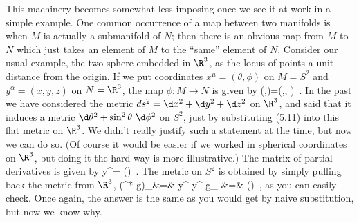 \documentclass[12pt]{article}
\begin{document}
This machinery becomes somewhat less imposing once we see it at work
in a simple example.  One common occurrence of a map between two
manifolds is when $M$ is actually a submanifold of $N$; then there is
an obvious map from $M$ to $N$ which just takes an element of $M$ to
the ``same'' element of $N$.  Consider our usual example, the two-sphere
embedded in $\R^3$, as the locus of points a unit distance from the 
origin.  If we put coordinates $x^\mu=(\theta,\phi)$ on $M=S^2$ and 
$y^\alpha=(x,y,z)$ on $N=\R^3$, the map $\phi:M\rightarrow N$ is given by
\be
  \phi(\theta,\phi)=(\sin\theta \cos\phi,\sin\theta \sin\phi,
  \cos\theta)\ .\label{5.11}
\ee
In the past we have considered the metric $ds^2=\d x^2+\d y^2+ \d z^2$
on $\R^3$, and said that it induces a metric $\d\theta^2 +\sin^2\theta
~\d\phi^2$ on $S^2$, just by substituting (5.11) into this flat metric
on $\R^3$.  We didn't really justify such a statement at the
time, but now we can do so.  (Of course it would be easier if we
worked in spherical coordinates on $\R^3$, but doing it the hard way
is more illustrative.)  The matrix of partial derivatives is given
by
\be
  {{\partial y^{\alpha}}}=
  \left(\matrix{\cos\theta \cos\phi &\cos\theta \sin\phi &-\sin\theta\cr
  -\sin\theta \sin\phi &\sin\theta \cos\phi & 0\cr}\right)\ .\label{5.12}
\ee
The metric on $S^2$ is obtained by simply pulling back the metric from
$\R^3$,
\bea
  (\phi^* g)_\mn &=&  {{\partial y^{\alpha}}
  }{{\partial y^{\beta}}
  }g_{\alpha\beta}\cr
  &=& \left(\right)\ ,\label{5.13}
\eea
as you can easily check.  Once again, the answer is the same as you
would get by naive substitution, but now we know why.
\end{document}
